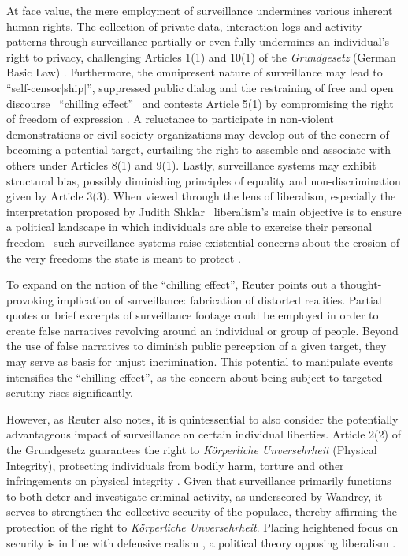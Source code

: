 \documentclass[12pt]{article}
\begin{document}
	At face value, the mere employment of surveillance undermines various inherent human rights. The collection of private data, interaction logs and activity patterns through surveillance partially or even fully undermines an individual's right to privacy, challenging Articles 1(1) and 10(1) of the \textit{Grundgesetz} (German Basic Law) \parencites{nandy2023, wetzling2023, grundgesetz2025}. Furthermore, the omnipresent nature of surveillance may lead to ``self-censor[ship]'', suppressed public dialog and the restraining of free and open discourse \textemdash\ ``chilling effect'' \textemdash\ and contests Article 5(1) by compromising the right of freedom of expression \parencite{murray2024}. A reluctance to participate in non-violent demonstrations or civil society organizations may develop out of the concern of becoming a potential target, curtailing the right to assemble and associate with others under Articles 8(1) and 9(1). Lastly, surveillance systems may exhibit structural bias, possibly diminishing principles of equality and non-discrimination given by Article 3(3). When viewed through the lens of liberalism, especially the interpretation proposed by Judith Shklar \textemdash\ liberalism's main objective is to ensure a political landscape in which individuals are able to exercise their personal freedom \textemdash\ such surveillance systems raise existential concerns about the erosion of the very freedoms the state is meant to protect \parencite[684]{bell2014}.
	
	To expand on the notion of the ``chilling effect'', Reuter points out a thought-provoking implication of surveillance: fabrication of distorted realities. Partial quotes or brief excerpts of surveillance footage could be employed in order to create false narratives revolving around an individual or group of people. Beyond the use of false narratives to diminish public perception of a given target, they may serve as basis for unjust incrimination. This potential to manipulate events intensifies the ``chilling effect'', as the concern about being subject to targeted scrutiny rises significantly. 
	
	However, as Reuter also notes, it is quintessential to also consider the potentially advantageous impact of surveillance on certain individual liberties. Article 2(2) of the Grundgesetz guarantees the right to \textit{Körperliche Unversehrheit} (Physical Integrity), protecting individuals from bodily harm, torture and other infringements on physical integrity \parencite{bildung_korperliche_nodate}. Given that surveillance primarily functions to both deter and investigate criminal activity, as underscored by Wandrey, it serves to strengthen the collective security of the populace, thereby affirming the protection of the right to \textit{Körperliche Unversehrheit}. Placing heightened focus on security is in line with defensive realism \parencite{courseCompanion2024}, a political theory opposing liberalism \parencite{jumarang2011}.  
	
\end{document}

